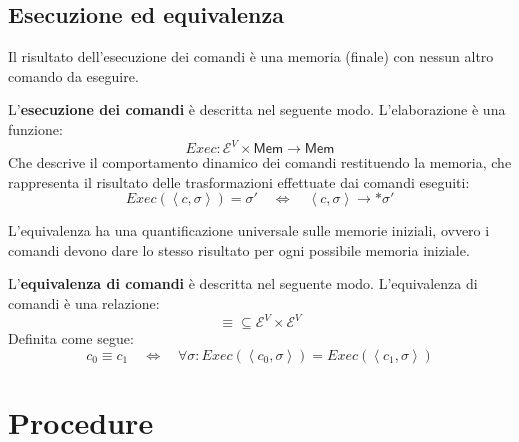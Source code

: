 \documentclass[a4paper]{article}
\begin{document}
 	\subsection{Esecuzione ed equivalenza}
 	
 	Il risultato dell'esecuzione dei comandi è una memoria (finale) con nessun altro comando da eseguire.
 	
 	\begin{boxdef}
 		L'\textcolor{Red3}{\textbf{esecuzione dei comandi}} è descritta nel seguente modo. L'elaborazione è una funzione:
 		\begin{equation*}
 			Exec: \mathcal{E}^{V} \times \mathsf{Mem} \longrightarrow \mathsf{Mem}
 		\end{equation*}
 		Che descrive il comportamento dinamico dei comandi restituendo la memoria, che rappresenta il risultato delle trasformazioni effettuate dai comandi eseguiti:
 		\begin{equation*}
 			Exec\left(\left\langle c,\sigma \right\rangle\right) = \sigma' \hspace{1em} \iff \hspace{1em} \left\langle c,\sigma \right\rangle \longrightarrow* \sigma'
 		\end{equation*}
 	\end{boxdef}
 	
 	\noindent
 	L'equivalenza ha una quantificazione universale sulle memorie iniziali, ovvero i comandi devono dare lo stesso risultato per ogni possibile memoria iniziale.
 	
 	\begin{boxdef}
 		L'\textcolor{Red3}{\textbf{equivalenza di comandi}} è descritta nel seguente modo. L'equivalenza di comandi è una relazione:
 		\begin{equation*}
 			\equiv \subseteq \mathcal{E}^{V} \times \mathcal{E}^{V}
 		\end{equation*}
 		Definita come segue:
 		\begin{equation*}
 			c_{0} \equiv c_{1} \hspace{1em} \iff \hspace{1em} \forall\sigma : Exec\left(\left\langle c_{0}, \sigma \right\rangle\right) = Exec\left(\left\langle c_{1}, \sigma \right\rangle\right)
 		\end{equation*}
 	\end{boxdef}\newpage
 	
 	\section{Procedure}
 	
\end{document}
